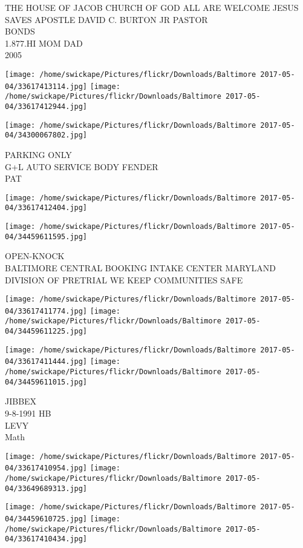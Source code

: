 \documentclass[10pt,letterpaper]{article}
\begin{document}
THE HOUSE OF JACOB CHURCH OF GOD ALL ARE WELCOME JESUS SAVES APOSTLE DAVID C. BURTON JR PASTOR\\
BONDS\\
1.877.HI MOM DAD\\
2005
\pagebreak

\texttt{[image: /home/swickape/Pictures/flickr/Downloads/Baltimore 2017-05-04/33617413114.jpg]}
\texttt{[image: /home/swickape/Pictures/flickr/Downloads/Baltimore 2017-05-04/33617412944.jpg]}

\vspace{0.25in}
\texttt{[image: /home/swickape/Pictures/flickr/Downloads/Baltimore 2017-05-04/34300067802.jpg]}

PARKING ONLY\\
G+L AUTO SERVICE BODY FENDER\\
PAT
\pagebreak

\texttt{[image: /home/swickape/Pictures/flickr/Downloads/Baltimore 2017-05-04/33617412404.jpg]}

\vspace{0.25in}
\texttt{[image: /home/swickape/Pictures/flickr/Downloads/Baltimore 2017-05-04/34459611595.jpg]}

OPEN{-}KNOCK\\
BALTIMORE CENTRAL BOOKING INTAKE CENTER MARYLAND DIVISION OF PRETRIAL WE KEEP COMMUNITIES SAFE
\pagebreak

\texttt{[image: /home/swickape/Pictures/flickr/Downloads/Baltimore 2017-05-04/33617411774.jpg]}
\texttt{[image: /home/swickape/Pictures/flickr/Downloads/Baltimore 2017-05-04/34459611225.jpg]}

\texttt{[image: /home/swickape/Pictures/flickr/Downloads/Baltimore 2017-05-04/33617411444.jpg]}
\texttt{[image: /home/swickape/Pictures/flickr/Downloads/Baltimore 2017-05-04/34459611015.jpg]}

JIBBEX\\
9{-}8{-}1991 HB\\
LEVY\\
Math
\pagebreak

\texttt{[image: /home/swickape/Pictures/flickr/Downloads/Baltimore 2017-05-04/33617410954.jpg]}
\texttt{[image: /home/swickape/Pictures/flickr/Downloads/Baltimore 2017-05-04/33649689313.jpg]}

\texttt{[image: /home/swickape/Pictures/flickr/Downloads/Baltimore 2017-05-04/34459610725.jpg]}
\texttt{[image: /home/swickape/Pictures/flickr/Downloads/Baltimore 2017-05-04/33617410434.jpg]}
\end{document}
